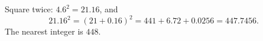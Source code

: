 Square twice: $4.6^2=21.16$, and
\[
21.16^2=(21+0.16)^2=441+6.72+0.0256=447.7456 .
\]
The nearest integer is $\boxed{448}$.
